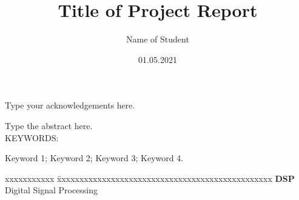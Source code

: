 \documentclass[BTech]{iiitdmdiss}
\begin{document}
\title{Title of Project Report}
\author{Name of Student}
\date{01.05.2021}

\maketitle

\declaration


\certificate
\acknowledgements

Type your acknowledgements here.

\abstract

Type the abstract here.
\\
\vspace{10pt}
\noindent KEYWORDS: \hspace*{0.5em} \parbox[t]{4.4in}{Keyword 1; Keyword 2; Keyword 3; Keyword 4.}


\pagebreak


\begin{singlespace}
\tableofcontents
\thispagestyle{empty}

\listoftables
{}
\listoffigures
{}
\end{singlespace}


\abbreviations

\noindent 
\begin{tabbing}
xxxxxxxxxxx \= xxxxxxxxxxxxxxxxxxxxxxxxxxxxxxxxxxxxxxxxxxxxxxxx \kill
\textbf{DSP}   \> Digital Signal Processing\\

\end{tabbing}
\end{document}
